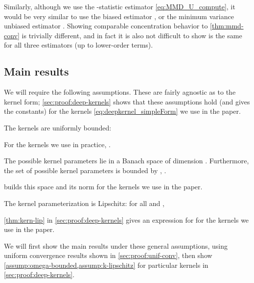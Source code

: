 \documentclass{article}
\begin{document}
Similarly, although we use the -statistic estimator \eqref{eq:MMD_U_compute},
it would be very similar to use
the biased estimator ,
or the minimum variance unbiased estimator .
Showing comparable concentration behavior to \cref{thm:mmd-conv} is trivially different,
and in fact it is also not difficult to show  is the same for all three estimators (up to lower-order terms).

\subsection{Main results} \label{sec:proof:main}
We will require the following assumptions.
These are fairly agnostic as to the kernel form;
\cref{sec:proof:deep-kernels} shows that these assumptions hold
(and gives the constants)
for the kernels \eqref{eq:deepkernel_simpleForm} we use in the paper.
\begin{assumplist}
  \item \label{assump:k-bounded}
    The kernels  are uniformly bounded:
    
    For the kernels we use in practice, .

  \item \label{assump:omega-bounded}
    The possible kernel parameters 
    lie in a Banach space of dimension .
    Furthermore, the set of possible kernel parameters 
    is bounded by ,
    .

     builds this space and its norm for the kernels we use in the paper.

  \item \label{assump:k-lipschitz}
    The kernel parameterization is Lipschitz:
    for all 
    and ,
    
    \cref{thm:kern-lip} in \cref{sec:proof:deep-kernels} gives an expression for  for the kernels we use in the paper.
\end{assumplist}

We will first show the main results under these general assumptions,
using uniform convergence results shown in \cref{sec:proof:unif-conv},
then show \cref{assump:omega-bounded,assump:k-lipschitz} for particular kernels in \cref{sec:proof:deep-kernels}.
\end{document}

